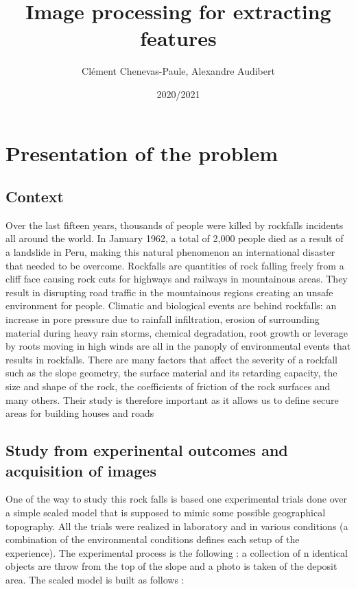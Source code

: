 \documentclass{article}
\title{\textbf{Image processing for extracting features}}
\author{Clément Chenevas-Paule, Alexandre Audibert}
\date{2020/2021}
\begin{document}
\setlength\parindent{0pt}

\begin{titlepage}
\maketitle
\end{titlepage}




\tableofcontents
\newpage


\section{Presentation of the problem}
\noindent
\subsection{Context}

Over the last fifteen years, thousands of people were killed by rockfalls incidents all
around the world. In January 1962, a total of 2,000 people died as a result of a landslide in
Peru, making this natural phenomenon an international disaster that needed to be overcome. Rockfalls are quantities of rock falling freely from a cliff face causing rock cuts for
highways and railways in mountainous areas. They result in disrupting road traffic in the
mountainous regions creating an unsafe environment for people. Climatic and biological
events are behind rockfalls: an increase in pore pressure due to rainfall infiltration, erosion
of surrounding material during heavy rain storms, chemical degradation, root growth or
leverage by roots moving in high winds are all in the panoply of environmental events
that results in rockfalls. There are many factors that affect the severity of a rockfall such
as the slope geometry, the surface material and its retarding capacity, the size and shape
of the rock, the coefficients of friction of the rock surfaces and many others. Their study
is therefore important as it allows us to define secure areas for building houses and roads

\subsection{Study from experinental outcomes and acquisition of images}

One of the way to study this rock falls is based one experimental trials done over
a simple scaled model that is supposed to mimic some possible geographical topography. All the trials were realized in laboratory and in various conditions (a combination
of the environmental conditions defines each setup of the experience). The experimental process is the following : a collection of n identical objects are throw from the top
of the slope and a photo is taken of the deposit area. The scaled model is built as follows :\\
\end{document}
